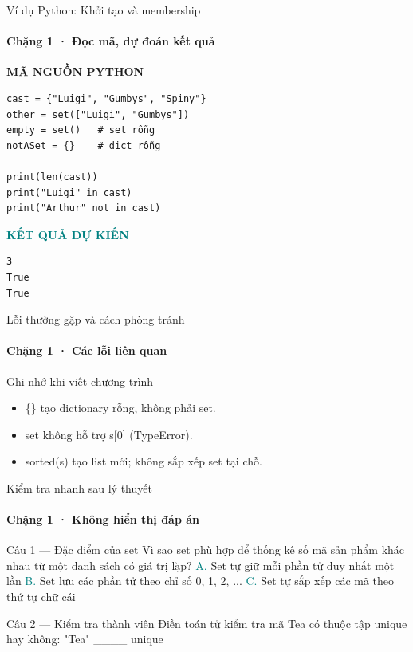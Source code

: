 \documentclass[aspectratio=169,10pt]{beamer}
\begin{document}
\begin{frame}[fragile,t]{Ví dụ Python: Khởi tạo và membership}
\framesubtitle{Chặng 1 · Đọc mã, dự đoán kết quả}
\vspace{-1mm}
{\small\color{muted}\textbf{MÃ NGUỒN PYTHON}}\par\vspace{1mm}
\begin{Verbatim}[fontsize=\scriptsize,frame=single,framesep=4mm,rulecolor=\color{teal!35},breaklines=true]
cast = {"Luigi", "Gumbys", "Spiny"}
other = set(["Luigi", "Gumbys"])
empty = set()   # set rỗng
notASet = {}    # dict rỗng

print(len(cast))
print("Luigi" in cast)
print("Arthur" not in cast)
\end{Verbatim}
\vspace{1mm}\textcolor{teal}{\scriptsize\textbf{KẾT QUẢ DỰ KIẾN}}
\begin{Verbatim}[fontsize=\scriptsize,breaklines=true]
3
True
True
\end{Verbatim}

\end{frame}

\begin{frame}[t]{Lỗi thường gặp và cách phòng tránh}
\framesubtitle{Chặng 1 · Các lỗi liên quan}
\begin{alertblock}{Ghi nhớ khi viết chương trình}
\begin{itemize}
\item \{\} tạo dictionary rỗng, không phải set.
\item set không hỗ trợ s[0] (TypeError).
\item sorted(s) tạo list mới; không sắp xếp set tại chỗ.
\end{itemize}
\end{alertblock}

\end{frame}

\begin{frame}[t]{Kiểm tra nhanh sau lý thuyết}
\framesubtitle{Chặng 1 · Không hiển thị đáp án}
\small\begin{block}{Câu 1 — Đặc điểm của set}
Vì sao set phù hợp để thống kê số mã sản phẩm khác nhau từ một danh sách có giá trị lặp?
\medskip
\quad \textcolor{teal}{A.} Set tự giữ mỗi phần tử duy nhất một lần\hspace{3mm}
\quad \textcolor{teal}{B.} Set lưu các phần tử theo chỉ số 0, 1, 2, ...\hspace{3mm}
\quad \textcolor{teal}{C.} Set tự sắp xếp các mã theo thứ tự chữ cái\hspace{3mm}
\end{block}
\begin{block}{Câu 2 — Kiểm tra thành viên}
Điền toán tử kiểm tra mã Tea có thuộc tập unique hay không: "Tea" \_\_\_\_ unique
\end{block}
\end{frame}
\end{document}
